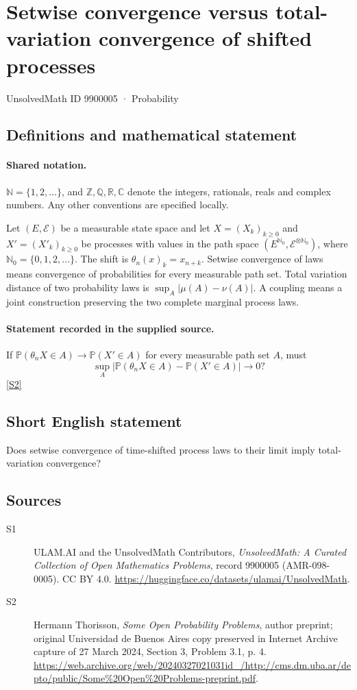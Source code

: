 \documentclass[11pt]{article}
\newcommand{\sref}[2]{\hyperlink{source:#1:#2}{[S#2]}}
\begin{document}
\setcounter{section}{9900004}
\section{Setwise convergence versus total-variation convergence of shifted processes}\label{9900005}
{\small\sffamily UnsolvedMath ID 9900005 · Probability}
\subsection{Definitions and mathematical statement}

\paragraph{Shared notation.}$\mathbb N=\{1,2,\ldots\}$, and $\mathbb Z,\mathbb Q,\mathbb R,\mathbb C$ denote the integers, rationals, reals and complex numbers. Any other conventions are specified locally.


Let $(E,\mathcal E)$ be a measurable state space and let $X=(X_k)_{k\ge0}$ and $X'=(X'_k)_{k\ge0}$ be processes with values in the path space $(E^{\mathbb N_0},\mathcal E^{\otimes\mathbb N_0})$, where $\mathbb N_0=\{0,1,2,\ldots\}$. The shift is $\theta_n(x)_k=x_{n+k}$. Setwise convergence of laws means convergence of probabilities for every measurable path set. Total variation distance of two probability laws is $\sup_A|\mu(A)-\nu(A)|$. A coupling means a joint construction preserving the two complete marginal process laws.
\paragraph{Statement recorded in the supplied source.}
If $\mathbb P(\theta_nX\in A)\to\mathbb P(X'\in A)$ for every measurable path set $A$, must
\[\sup_A|\mathbb P(\theta_nX\in A)-\mathbb P(X'\in A)|\longrightarrow0?\] \sref{9900005}{2}
\subsection{Short English statement}
Does setwise convergence of time-shifted process laws to their limit imply total-variation convergence?
\subsection{Sources}
\begin{description}
\item[\hypertarget{source:9900005:1}{S1}] ULAM.AI and the UnsolvedMath Contributors, \emph{UnsolvedMath: A Curated Collection of Open Mathematics Problems}, record 9900005 (AMR-098-0005). CC BY 4.0. \url{https://huggingface.co/datasets/ulamai/UnsolvedMath}.
\item[\hypertarget{source:9900005:2}{S2}] Hermann Thorisson, \emph{Some Open Probability Problems}, author preprint; original Universidad de Buenos Aires copy preserved in Internet Archive capture of 27 March 2024, Section 3, Problem 3.1, p. 4. \url{https://web.archive.org/web/20240327021031id_/http://cms.dm.uba.ar/depto/public/Some%20Open%20Problems-preprint.pdf}.
\end{description}
\label{end:9900005}
\end{document}
